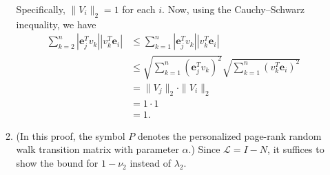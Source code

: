 \documentclass{article}
\newcommand{\1}{\mathbf{1}}
\newcommand{\0}{\mathbf{0}}
\newcommand{\e}{\mathbf{e}}
\renewcommand{\L}{\mathcal{L}}
\begin{document}
\begin{enumerate}
\begin{enumerate}
    Specifically, $\|V_i\|_2 = 1$ for each $i$.
    Now, using the Cauchy--Schwarz inequality, we have
    \begin{align*}
      \sum_{k = 2}^n \left|\e_j^T v_k\right| \left|v_k^T \e_i\right| & \leq
      \sum_{k = 1}^n \left|\e_j^T v_k\right| \left|v_k^T \e_i\right| \\
      & \leq \sqrt{\sum_{k = 1}^n (\e_j^T v_k)^2} \sqrt{\sum_{k = 1}^n (v_k^T \e_i)^2} \\
      & = \|V_j\|_2 \cdot \|V_i\|_2 \\
      & = 1 \cdot 1 \\
      & = 1.
    \end{align*}
  \item
    (In this proof, the symbol $P$ denotes the personalized page-rank random walk transition matrix with parameter $\alpha$.)
    Since $\L = I - N$, it suffices to show the bound for $1 - \nu_2$ instead of $\lambda_2$.


\end{enumerate}
\end{enumerate}
\end{document}
